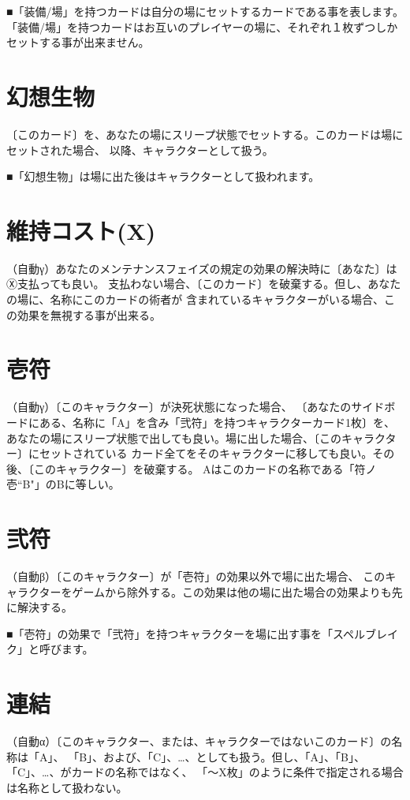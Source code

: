 \documentclass[fontsize=9pt,twocolumn,hanging_punctuation]{jlreq}
\begin{document}
■「装備/場」を持つカードは自分の場にセットするカードである事を表します。
「装備/場」を持つカードはお互いのプレイヤーの場に、それぞれ１枚ずつしかセットする事が出来ません。

\section*{幻想生物}
〔このカード〕を、あなたの場にスリープ状態でセットする。このカードは場にセットされた場合、
以降、キャラクターとして扱う。

■「幻想生物」は場に出た後はキャラクターとして扱われます。

\section*{維持コスト(X)}
（自動γ）あなたのメンテナンスフェイズの規定の効果の解決時に〔あなた〕はⓍ支払っても良い。
支払わない場合、〔このカード〕を破棄する。但し、あなたの場に、名称にこのカードの術者が
含まれているキャラクターがいる場合、この効果を無視する事が出来る。

\section*{壱符}
（自動γ）〔このキャラクター〕が決死状態になった場合、
〔あなたのサイドボードにある、名称に「A」を含み「弐符」を持つキャラクターカード1枚〕を、
あなたの場にスリープ状態で出しても良い。場に出した場合、〔このキャラクター〕にセットされている
カード全てをそのキャラクターに移しても良い。その後、〔このキャラクター〕を破棄する。
Aはこのカードの名称である「符ノ壱``B"」のBに等しい。

\section*{弐符}
（自動β）〔このキャラクター〕が「壱符」の効果以外で場に出た場合、
このキャラクターをゲームから除外する。この効果は他の場に出た場合の効果よりも先に解決する。

■「壱符」の効果で「弐符」を持つキャラクターを場に出す事を「スペルブレイク」と呼びます。

\pagebreak
\section*{連結}
（自動α）〔このキャラクター、または、キャラクターではないこのカード〕の名称は「A」、
「B」、および、「C」、…、としても扱う。但し、「A」、「B」、「C」、…、がカードの名称ではなく、
「～X枚」のように条件で指定される場合は名称として扱わない。
\end{document}
